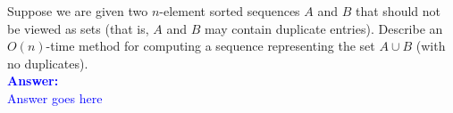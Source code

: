 \item{}
Suppose we are given two $n$-element sorted sequences $A$ and $B$ that should
not be viewed as sets (that is, $A$ and $B$ may contain duplicate entries).
Describe an $O(n)$-time method for computing a sequence representing the set
$A\cup B$ (with no duplicates).\\[12pt]
\ifanswers
\textcolor{blue}{
\textbf{Answer:}\\[6pt]
Answer goes here
}
\newpage
\fi
